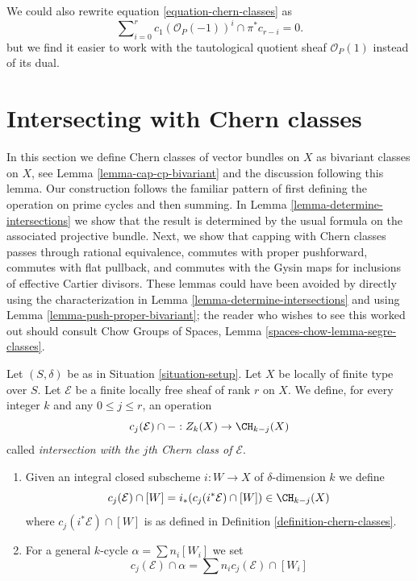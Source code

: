 \begin{remark}
\label{remark-equation-signs}
We could also rewrite equation \ref{equation-chern-classes} as
\begin{equation}
\label{equation-signs}
\sum\nolimits_{i = 0}^r
c_1(\mathcal{O}_P(-1))^i \cap \pi^*c_{r - i}
= 0.
\end{equation}
but we find it easier to work with the tautological quotient
sheaf $\mathcal{O}_P(1)$ instead of
its dual.
\end{remark}




\section{Intersecting with Chern classes}
\label{section-intersecting-chern-classes}

\noindent
In this section we define Chern classes of vector bundles on $X$ as
bivariant classes on $X$, see Lemma \ref{lemma-cap-cp-bivariant}
and the discussion following this lemma. Our construction follows the familiar
pattern of first defining the operation on prime cycles and then
summing. In Lemma \ref{lemma-determine-intersections} we show
that the result is determined by the usual formula on the associated
projective bundle. Next, we show that capping with Chern classes
passes through rational equivalence, commutes with proper pushforward,
commutes with flat pullback, and commutes with the Gysin maps for
inclusions of effective Cartier divisors. These lemmas could have been
avoided by directly using the characterization in
Lemma \ref{lemma-determine-intersections} and using
Lemma \ref{lemma-push-proper-bivariant}; the reader who wishes to
see this worked out should consult
Chow Groups of Spaces, Lemma \ref{spaces-chow-lemma-segre-classes}.

\begin{definition}
\label{definition-cap-chern-classes}
Let $(S, \delta)$ be as in Situation \ref{situation-setup}.
Let $X$ be locally of finite type over $S$.
Let $\mathcal{E}$ be a finite locally free sheaf of rank $r$ on $X$.
We define, for every integer $k$ and any $0 \leq j \leq r$,
an operation
$$
c_j(\mathcal{E}) \cap - : Z_k(X) \to \CH_{k - j}(X)
$$
called {\it intersection with the $j$th Chern class of $\mathcal{E}$}.
\begin{enumerate}
\item Given an integral closed subscheme $i : W \to X$ of $\delta$-dimension
$k$ we define
$$
c_j(\mathcal{E}) \cap [W] = i_*(c_j({i^*\mathcal{E}}) \cap [W])
\in
\CH_{k - j}(X)
$$
where $c_j({i^*\mathcal{E}}) \cap [W]$ is as defined in
Definition \ref{definition-chern-classes}.
\item For a general $k$-cycle $\alpha = \sum n_i [W_i]$ we set
$$
c_j(\mathcal{E}) \cap \alpha = \sum n_i c_j(\mathcal{E}) \cap [W_i]
$$
\end{enumerate}
\end{definition}

